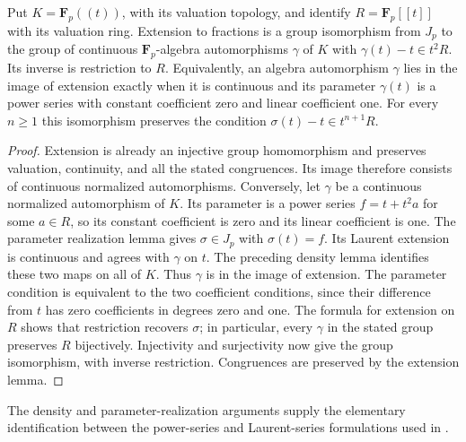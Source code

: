 \begin{lemma}
\label{lem:nottingham-laurent-equivalence}
\leanok
Put $K=\mathbf F_p((t))$, with its valuation topology, and identify
$R=\mathbf F_p[[t]]$ with its valuation ring. Extension to fractions
is a group isomorphism from $J_p$ to the group of continuous
$\mathbf F_p$-algebra automorphisms $\gamma$ of $K$ with
$\gamma(t)-t\in t^2R$. Its inverse is restriction to $R$.
Equivalently, an algebra automorphism $\gamma$ lies in the image
of extension exactly when it is continuous and its parameter
$\gamma(t)$ is a power series with constant coefficient zero and
linear coefficient one.
For every $n\ge1$ this isomorphism preserves the condition
$\sigma(t)-t\in t^{n+1}R$.
\end{lemma}

\begin{proof}
Extension is already an injective group homomorphism and preserves
valuation, continuity, and all the stated congruences. Its image
therefore consists of continuous normalized automorphisms.
Conversely, let $\gamma$ be a continuous normalized automorphism of
$K$. Its parameter is a power series $f=t+t^2a$ for some $a\in R$,
so its constant coefficient is zero and its linear coefficient is
one. The parameter realization lemma gives $\sigma\in J_p$ with
$\sigma(t)=f$. Its Laurent extension is continuous and agrees with
$\gamma$ on $t$. The preceding density lemma identifies these two
maps on all of $K$. Thus $\gamma$ is in the image of extension.
The parameter condition is equivalent to the two coefficient
conditions, since their difference from $t$ has zero coefficients
in degrees zero and one. The formula for extension on $R$ shows that
restriction recovers $\sigma$; in particular, every $\gamma$ in the
stated group preserves $R$ bijectively. Injectivity and surjectivity
now give the group isomorphism, with inverse restriction. Congruences
are preserved by the extension lemma.
\end{proof}

The density and parameter-realization arguments supply the elementary
identification between the power-series and Laurent-series formulations
used in \cite{Camina1997}.

